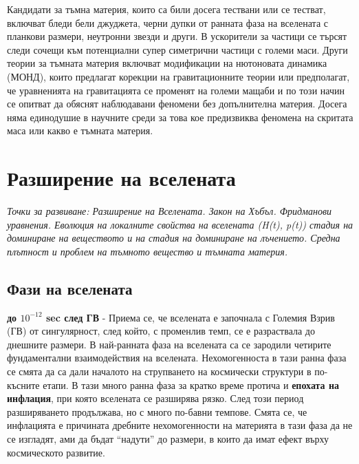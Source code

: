 \documentclass[a4paper,12pt]{article}
\begin{document}
Кандидати за тъмна материя, които са били досега тествани или се тестват, включват бледи бели джуджета, черни дупки от ранната фаза на вселената с планкови размери, неутронни звезди и други. В ускорители за частици се търсят следи сочещи към потенциални супер симетрични частици с големи маси. Други теории за тъмната материя включват модификации на нютоновата динамика (МОНД), които предлагат корекции на гравитационните теории или предполагат, че уравненията на гравитацията се променят на големи мащаби и по този начин се опитват да обяснят наблюдавани феномени без допълнителна материя. Досега няма единодушие в научните среди за това кое предизвиква феномена на скритата маса или какво е тъмната материя.


\section{Разширение на вселената}
\textit{Точки за развиване: Разширение на Вселената. Закон на Хъбъл. Фридманови уравнения. Еволюция на локалните свойства на вселената (H(t), p(t)) стадия на доминиране на веществото и на стадия на доминиране на лъчението. Средна плътност и проблем на тъмното вещество и тъмната материя.}\\

\subsection{Фази на вселената}
\label{se:Fazi_na_vselenata}

\textbf{до $10^{-12}$ sec след ГВ} - Приема се, че вселената е започнала с Големия Взрив (ГВ) от сингулярност, след който, с променлив темп, се е разраствала до днешните размери. В най-ранната фаза на вселената са се зародили четирите фундаментални взаимодействия на вселената. Нехомогенноста в тази ранна фаза се смята да са дали началото на струпването на космически структури в по-късните етапи. В тази много ранна фаза за кратко време протича и \textbf{епохата на инфлация}, при която вселената се разширява рязко. След този период разширяването продължава, но с много по-бавни темпове. Смята се, че инфлацията е причината дребните нехомогенности на материята в тази фаза да не се изгладят, ами да бъдат ``надути'' до размери, в които да имат ефект върху космическото развитие.\\
\end{document}
